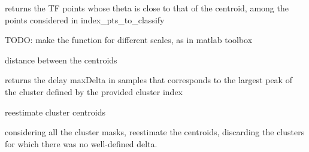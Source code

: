 \documentclass[letterpaper,10pt,english]{sphinxmanual}
\begin{document}
\begin{fulllineitems}
\begin{fulllineitems}
\end{fulllineitems}


\begin{fulllineitems}
\label{reference/demix:pyfasst.demixTF.DEMIX.getTFpointsNearTheta_OneScale}
returns the TF points whose theta is close to that of the centroid,
among the points considered in index\_pts\_to\_classify

TODO: make the function for different scales, as in matlab toolbox

\end{fulllineitems}


\begin{fulllineitems}
\label{reference/demix:pyfasst.demixTF.DEMIX.get_centroid_distance}
distance between the centroids

\end{fulllineitems}


\begin{fulllineitems}
\label{reference/demix:pyfasst.demixTF.DEMIX.identify_deltaT}
returns the delay maxDelta in samples that corresponds to the
largest peak of the cluster defined by the provided cluster index

\end{fulllineitems}


\begin{fulllineitems}
\label{reference/demix:pyfasst.demixTF.DEMIX.reestimate_clusterCentroids}
reestimate cluster centroids

considering all the cluster masks, reestimate the centroids,
discarding the clusters for which there was no well-defined delta.

\end{fulllineitems}


\end{fulllineitems}
\end{document}
